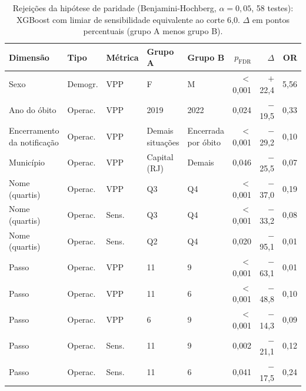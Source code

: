 \begin{table}[htbp]
\centering
\caption{Rejei\c{c}\~oes da hip\'otese de paridade (Benjamini-Hochberg, $\alpha = 0{,}05$, 58 testes): XGBoost com limiar de sensibilidade equivalente ao corte 6{,}0. $\Delta$ em pontos percentuais (grupo A menos grupo B).}
\label{tab:qw3-fairness-rejections}
\footnotesize\setlength{\tabcolsep}{3pt}
\begin{tabular}{lllllrrr}
\toprule
Dimens\~ao & Tipo & M\'etrica & Grupo A & Grupo B & $p_{\mathrm{FDR}}$ & $\Delta$ & OR \\
\midrule
Sexo & Demogr. & VPP & F & M & $<$0{,}001 & $+$22{,}4 & 5{,}56 \\
Ano do \'obito & Operac. & VPP & 2019 & 2022 & 0{,}024 & $-$19{,}5 & 0{,}33 \\
Encerramento da notifica\c{c}\~ao & Operac. & VPP & Demais situa\c{c}\~oes & Encerrada por \'obito & $<$0{,}001 & $-$29{,}2 & 0{,}10 \\
Munic\'ipio & Operac. & VPP & Capital (RJ) & Demais & 0{,}046 & $-$25{,}5 & 0{,}07 \\
Nome (quartis) & Operac. & VPP & Q3 & Q4 & $<$0{,}001 & $-$37{,}0 & 0{,}19 \\
Nome (quartis) & Operac. & Sens. & Q3 & Q4 & $<$0{,}001 & $-$33{,}2 & 0{,}08 \\
Nome (quartis) & Operac. & Sens. & Q2 & Q4 & 0{,}020 & $-$95{,}1 & 0{,}01 \\
Passo & Operac. & VPP & 11 & 9 & $<$0{,}001 & $-$63{,}1 & 0{,}01 \\
Passo & Operac. & VPP & 11 & 6 & $<$0{,}001 & $-$48{,}8 & 0{,}10 \\
Passo & Operac. & VPP & 6 & 9 & $<$0{,}001 & $-$14{,}3 & 0{,}09 \\
Passo & Operac. & Sens. & 11 & 9 & 0{,}002 & $-$21{,}1 & 0{,}12 \\
Passo & Operac. & Sens. & 11 & 6 & 0{,}041 & $-$17{,}5 & 0{,}24 \\
\bottomrule
\end{tabular}
\end{table}
